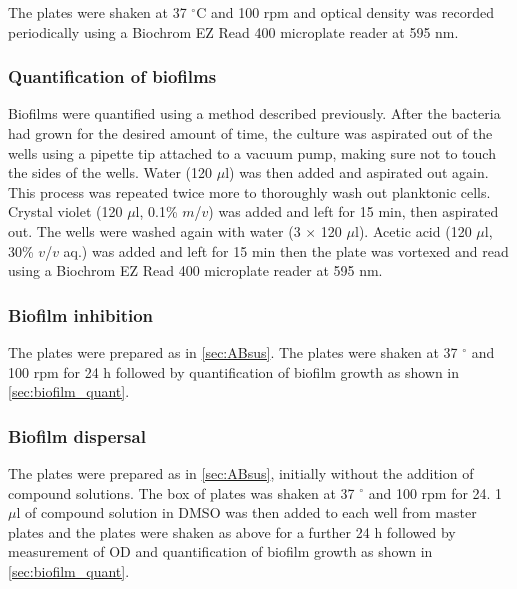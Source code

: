 The plates were shaken at 37 $^{\circ}$C and 100 rpm and optical density was recorded periodically using a Biochrom EZ Read 400 microplate reader at 595 nm.

\subsubsection{Quantification of biofilms\label{sec:biofilm_quant}}

Biofilms were quantified using a method described previously\cite{OToole1998,Li2015a}.
After the bacteria had grown for the desired amount of time, the culture was aspirated out of the wells using a pipette tip attached to a vacuum pump, making sure not to touch the sides of the wells. Water (120 $\mu$l) was then added and aspirated out again. This process was repeated twice more to thoroughly wash out planktonic cells. Crystal violet (120 $\mu$l, 0.1\% $m$/$v$) was added and left for 15 min, then aspirated out. The wells were washed again with water (3 $\times$ 120 $\mu$l). Acetic acid (120 $\mu$l, 30\% $v$/$v$ aq.) was added and left for 15 min then the plate was vortexed and read using a Biochrom EZ Read 400 microplate reader at 595 nm.

\subsubsection{Biofilm inhibition}

The plates were prepared as in \ref{sec:ABsus}. The plates were shaken at 37 $^{\circ}$ and 100 rpm for 24 h followed by quantification of biofilm growth as shown in \ref{sec:biofilm_quant}.

\subsubsection{Biofilm dispersal \label{sec:disp}}

The plates were prepared as in \ref{sec:ABsus}, initially without the addition of compound solutions. The box of plates was shaken at 37 $^{\circ}$ and 100 rpm for 24.
1 $\mu$l of compound solution in DMSO was then added to each well from master plates and the plates were shaken as above for a further 24 h followed by measurement of OD and quantification of biofilm growth as shown in \ref{sec:biofilm_quant}.

